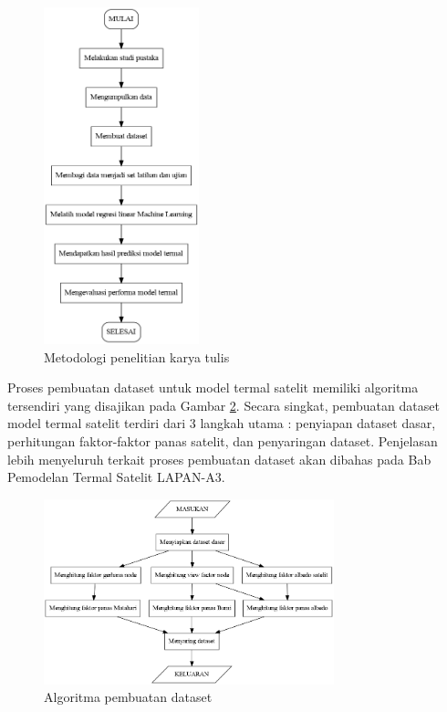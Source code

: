 \begin{figure}[H]
\setlength{}
\begin{center}
\includegraphics[width=0.4\textwidth]{fig/graph_metodologi.png}
\caption{Metodologi penelitian karya tulis}
\label{fig:metodologi}
\end{center}
\end{figure}

Proses pembuatan dataset untuk model termal satelit memiliki algoritma
tersendiri yang disajikan pada Gambar \ref{fig:algoritma}. Secara singkat,
pembuatan dataset model termal satelit terdiri dari 3 langkah utama : penyiapan
dataset dasar, perhitungan faktor-faktor panas satelit, dan penyaringan
dataset. Penjelasan lebih menyeluruh terkait proses pembuatan dataset akan
dibahas pada Bab Pemodelan Termal Satelit LAPAN-A3.

\begin{figure}[H]
\setlength{}
\begin{center}
\includegraphics[width=0.75\textwidth]{fig/graph_algoritma.png}
\caption{Algoritma pembuatan dataset}
\label{fig:algoritma}
\end{center}
\end{figure}

